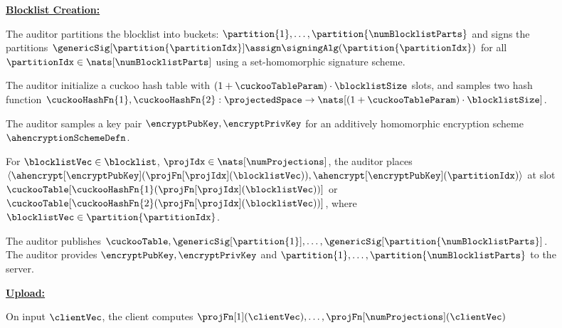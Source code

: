 \iffalse 
\begin{figure}[th!]
\footnotesize
	\begin{mdframed}
\noindent\textbf{\underline{Blocklist Creation:}}

\enumListStart
\item The auditor partitions the blocklist into \numBlocklistParts buckets: $\partition{1}, \dots, \partition{\numBlocklistParts}$ and signs the partitions $\genericSig[\partition{\partitionIdx}] \assign \signingAlg(\partition{\partitionIdx})$ for all $\partitionIdx \in \nats[\numBlocklistParts]$ using a set-homomorphic signature scheme. 




\item\label{fuzzy:pre:cht1} The auditor initialize a cuckoo hash table \cuckooTable with $(1 + \cuckooTableParam) \cdot \blocklistSize$ slots, and samples two hash function $\cuckooHashFn{1}, \cuckooHashFn{2}: \projectedSpace \rightarrow \nats[(1 + \cuckooTableParam) \cdot \blocklistSize]$. 

\item\label{fuzzy:pre:cht2} The auditor samples a key pair $\encryptPubKey, \encryptPrivKey$ for an additively homomorphic encryption scheme $\ahencryptionSchemeDefn$. 


\item\label{fuzzy:pre:cht3} For $\blocklistVec \in \blocklist$, $\projIdx \in \nats[\numProjections]$, the auditor places $\langle \ahencrypt[\encryptPubKey](\projFn[\projIdx](\blocklistVec)),\ahencrypt[\encryptPubKey](\partitionIdx) \rangle$ at slot $\cuckooTable[\cuckooHashFn{1}(\projFn[\projIdx](\blocklistVec))]$ or $\cuckooTable[\cuckooHashFn{2}(\projFn[\projIdx](\blocklistVec))]$, where $\blocklistVec \in \partition{\partitionIdx}$. 



\item The auditor publishes $\cuckooTable, \genericSig[\partition{1}], \dots, \genericSig[\partition{\numBlocklistParts}]$. The auditor provides $\encryptPubKey, \encryptPrivKey$ and $\partition{1}, \dots, \partition{\numBlocklistParts}$ to the server. 

\enumListEnd

\noindent\textbf{\underline{Upload:}}
\enumListStartResume
\item On input $\clientVec$, the client computes $\projFn[1](\clientVec), \dots, \projFn[\numProjections](\clientVec)$


\end{mdframed}
\end{figure}
